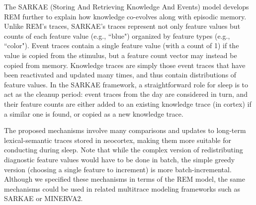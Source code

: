 \documentclass[10pt,letterpaper]{article}
\begin{document}
The SARKAE (Storing And Retrieving Knowledge And Events) model \cite{Nelson:2013} develops REM further to explain how knowledge co-evolves along with episodic memory. Unlike REM's traces, SARKAE's traces represent not only feature values but counts of each feature value (e.g., ``blue") organized by feature types (e.g., ``color"). Event traces contain a single feature value (with a count of 1) if the value is copied from the stimulus, but a feature count vector may instead be copied from memory. Knowledge traces are simply those event traces that have been reactivated and updated many times, and thus contain distributions of feature values. In the SARKAE framework, a straightforward role for sleep is to act as the cleanup period: event traces from the day are considered in turn, and their feature counts are either added to an existing knowledge trace (in cortex) if a similar one is found, or copied as a new knowledge trace. 

The proposed mechanisms involve many comparisons and updates to long-term lexical-semantic traces stored in neocortex, making them more suitable for conducting during sleep. Note that while the complex version of redistributing diagnostic feature values would have to be done in batch, the simple greedy version (choosing a single feature to increment) is more batch-incremental. Although we specified these mechanisms in terms of the REM model, the same mechanisms could be used in related multitrace modeling frameworks such as SARKAE or MINERVA2. 





\setlength{\bibleftmargin}{.125in}
\setlength{\bibindent}{-\bibleftmargin}

\vspace{-.2cm}


\end{document}
